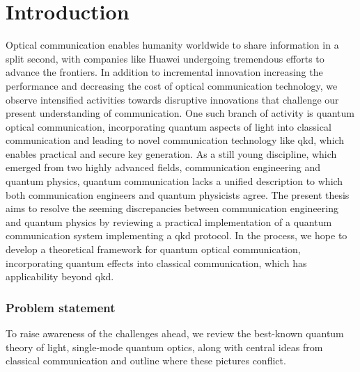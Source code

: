 \chapter*{Introduction}

Optical communication enables humanity worldwide to share information in a split second, with companies like Huawei undergoing tremendous efforts to advance the frontiers.
In addition to incremental innovation increasing the performance and decreasing the cost of optical communication technology, we observe intensified activities towards disruptive innovations that challenge our present understanding of communication.
One such branch of activity is quantum optical communication, incorporating quantum aspects of light into classical communication and leading to novel communication technology like \gls{qkd}, which enables practical and secure key generation.
As a still young discipline, which emerged from two highly advanced fields, communication engineering and quantum physics, quantum communication lacks a unified description to which both communication engineers and quantum physicists agree.
The present thesis aims to resolve the seeming discrepancies between communication engineering and quantum physics by reviewing a practical implementation of a quantum communication system implementing a \gls{qkd} protocol.
In the process, we hope to develop a theoretical framework for quantum optical communication, incorporating quantum effects into classical communication, which has applicability beyond \gls{qkd}.

\subsection*{Problem statement}

To raise awareness of the challenges ahead, we review the best-known quantum theory of light, single-mode quantum optics, along with central ideas from classical communication and outline where these pictures conflict.

